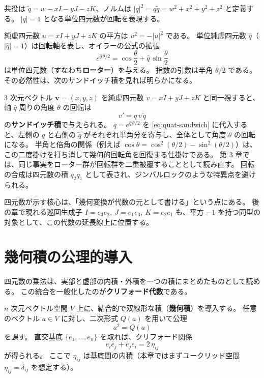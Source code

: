 \documentclass[dvipdfmx,a4paper,oneside]{jsbook}
\numberwithin{equation}{chapter}
\begin{document}
共役は \(\widetilde{q} = w - xI - yJ - zK\)、ノルムは \(|q|^2 = q\widetilde{q} = w^2 + x^2 + y^2 + z^2\) と定義する。
\(|q|=1\) となる単位四元数が回転を表現する。

純虚四元数 \(u = xI + yJ + zK\) の平方は \(u^2 = -|u|^2\) である。
単位純虚四元数 \(\hat{q}\)（\(|\hat{q}|=1\)）は回転軸を表し、オイラーの公式の拡張
\begin{equation}
  e^{\hat{q}\,\theta/2} = \cos\frac{\theta}{2} + \hat{q}\,\sin\frac{\theta}{2}
  \label{eq:quat-rotor}
\end{equation}
は単位四元数（すなわち\textbf{ローター}）を与える。
指数の引数は半角 \(\theta/2\) である。その必然性は、次のサンドイッチ積を見れば明らかになる。

3 次元ベクトル \(\mathbf{v}=(x,y,z)\) を純虚四元数 \(v = xI + yJ + zK\) と同一視すると、軸 \(\hat{q}\) 周りの角度 \(\theta\) の回転は
\begin{equation}
  v' = q\,v\,\widetilde{q}
  \label{eq:quat-sandwich}
\end{equation}
の\textbf{サンドイッチ積}で与えられる。
\(q=e^{\hat{q}\,\theta/2}\) を \eqref{eq:quat-sandwich} に代入すると、左側の \(q\) と右側の \(\widetilde{q}\) がそれぞれ半角分を寄与し、全体として角度 \(\theta\) の回転になる。
半角と倍角の関係（例えば \(\cos\theta=\cos^2(\theta/2)-\sin^2(\theta/2)\)）は、この二度掛けを打ち消して幾何的回転角を回復する仕掛けである。
第 3 章では、同じ事実をローター群が回転群を二重被覆することとして読み直す。
回転の合成は四元数の積 \(q_2 q_1\) として表され、ジンバルロックのような特異点を避けられる。

四元数が示す核心は、「幾何変換が代数の元として書ける」という点にある。
後の章で現れる巡回生成子 \(I=e_3e_2,\ J=e_1e_3,\ K=e_2e_1\) も、平方 \(-1\) を持つ同型の対象として、この代数の延長線上に位置する。

\section{幾何積の公理的導入}

四元数の乗法は、実部と虚部の内積・外積を一つの積にまとめたものとして読める。
この統合を一般化したのが\textbf{クリフォード代数}である。

\(n\) 次元ベクトル空間 \(V\) 上に、結合的で双線形な積（\textbf{幾何積}）を導入する。
任意のベクトル \(a \in V\) に対し、二次形式 \(Q(a)\) を用いて公理
\begin{equation}
  a^2 = Q(a)
  \label{eq:clifford-axiom}
\end{equation}
を課す。
直交基底 \(\{e_1,\ldots,e_n\}\) を取れば、クリフォード関係
\begin{equation}
  e_i e_j + e_j e_i = 2\,\eta_{ij}
  \label{eq:clifford-relation}
\end{equation}
が得られる。
ここで \(\eta_{ij}\) は基底間の内積（本章ではまずユークリッド空間 \(\eta_{ij}=\delta_{ij}\) を想定する）。
\end{document}
